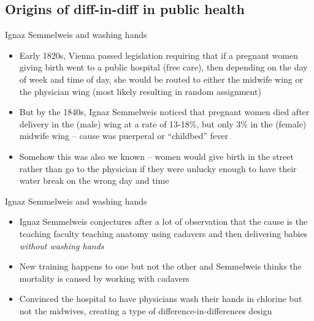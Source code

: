 \documentclass{beamer}
\begin{document}
\subsection{Origins of diff-in-diff in public health}


\begin{frame}{Ignaz Semmelweis and washing hands}

\begin{itemize}
\item Early 1820s, Vienna passed legislation requiring that if a pregnant women giving birth went to a public hospital (free care), then depending on the day of week and time of day, she would be routed to either the midwife wing or the physician wing (most likely resulting in random assignment)
\item But by the 1840s, Ignaz Semmelweis noticed that pregnant women died after delivery in the (male) wing at a rate of 13-18\%, but only 3\% in the (female) midwife wing -- cause was puerperal or “childbed” fever
\item Somehow this was also we known -- women would give birth in the street rather than go to the physician if they were unlucky enough to have their water break on the wrong day and time
\end{itemize}

\end{frame}

\begin{frame}{Ignaz Semmelweis and washing hands}

\begin{itemize}
\item Ignaz Semmelweis conjectures after a lot of observation that the cause is the teaching faculty teaching anatomy using cadavers and then delivering babies \emph{without washing hands}
\item New training happens to one but not the other and Semmelweis thinks the mortality is caused by working with cadavers
\item Convinced the hospital to have physicians wash their hands in chlorine but not the midwives, creating a type of difference-in-differences design
\end{itemize}

\end{frame}
\end{document}
